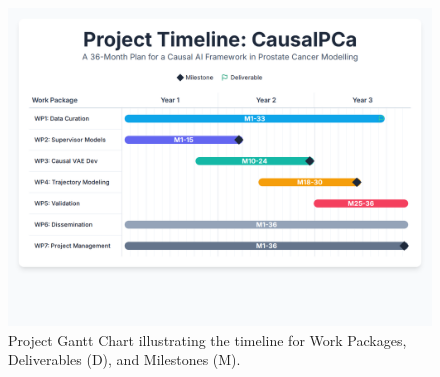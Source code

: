 \documentclass[11pt, a4paper]{article}
\begin{document}
\begin{figure}[H]
    \centering
    \includegraphics[width=\textwidth]{gantt.png}
    \caption{Project Gantt Chart illustrating the timeline for Work Packages, Deliverables (D), and Milestones (M).}
    \label{fig:gantt}
\end{figure}
\end{document}
